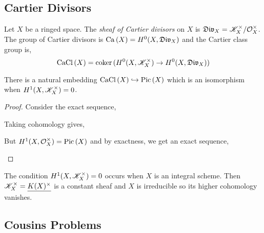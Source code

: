 \documentclass[12pt]{article}
\begin{document}
\subsection{Cartier Divisors}

\begin{defn}
Let $X$ be a ringed space. The \textit{sheaf of Cartier divisors} on $X$ is $\mathfrak{Div}_X = \mathscr{K}_X^\times / \mathcal{O}_{X}^\times$. The group of Cartier divisors is $\mathrm{Ca}\left( X \right) = H^0(X, \mathfrak{Div}_X)$ and the Cartier class group is,
\[ \mathrm{CaCl}\left( X \right) = \operatorname{\mathrm{coker}}{(H^0(X, \mathscr{K}_X^\times) \to H^0(X, \mathfrak{Div}_X))} \]
\end{defn}

\begin{prop}
There is a natural embedding $\mathrm{CaCl}\left( X \right) \hookrightarrow \mathrm{Pic} \left( X \right)$ which is an isomorphism when $H^1(X, \mathscr{K}_X^\times) = 0$.
\end{prop}

\begin{proof}
Consider the exact sequence,
\begin{center}
\end{center}
Taking cohomology gives,
\begin{center}
\end{center}
But $H^1(X, \mathcal{O}_{X}^\times) = \mathrm{Pic} \left( X \right)$ and by exactness, we get an exact sequence,
\begin{center}
\end{center}
\end{proof}

\begin{rmk}
The condition $H^1(X, \mathscr{K}_X^\times) = 0$ occurs when $X$ is an integral scheme. Then $\mathscr{K}_X^\times = \underline{K(X)^\times}$ is a constant sheaf and $X$ is irreducible so its higher cohomology vanishes. 
\end{rmk}


\subsection{Cousins Problems} 
\end{document}
